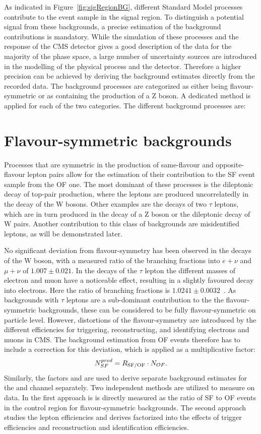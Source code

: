 As indicated in Figure~\ref{fig:sigRegionBG}, different Standard Model processes contribute to the event sample in the signal region. To distinguish a potential signal from these backgrounds, a precise estimation of the background contributions is mandatory. While the simulation of these processes and the response of the CMS detector gives a good description of the data for the majority of the phase space, a large number of uncertainty sources are introduced in the modelling of the physical process and the detector. Therefore a higher precision can be achieved by deriving the background estimates directly from the recorded data. The background processes are categorized as either being flavour-symmetric or as containing the production of a Z boson. A dedicated method is applied for each of the two categories. The different background processes are:

\section{Flavour-symmetric backgrounds}
Processes that are symmetric in the production of same-flavour and opposite-flavour lepton pairs allow for the estimation of their contribution to the SF event sample from the OF one. The most dominant of these processes is the dileptonic decay of top-pair production, where the leptons are produced uncorrelatedly in the decay of the W bosons. Other examples are the decays of two $\tau$ leptons, which are in turn produced in the decay of a Z boson or the dileptonic decay of W pairs. Another contribution to this class of backgrounds are misidentified leptons, as will be demonstrated later. 

No significant deviation from flavour-symmetry has been observed in the decays of the W boson, with a measured ratio of the branching fractions into $e+\nu$ and $\mu + \nu$ of $1.007\pm0.021$. In the decays of the $\tau$ lepton the different masses of electron and muon have a noticeable effect, resulting in a slightly favoured decay into electrons. Here the ratio of branching fractions is $1.0241\pm0.0032$~\cite{PDG}. As backgrounds with $\tau$ leptons are a sub-dominant contribution to the the flavour-symmetric backgrounds, these can be considered to be fully flavour-symmetric on particle level. However, distortions of the flavour-symmetry are introduced by the different efficiencies for triggering, reconstructing, and identifying electrons and muons in CMS. The background estimation from OF events therefore has to include a correction for this deviation, which is applied as a multiplicative factor:
\begin{equation}
N_{SF}^{pred} = R_{\text{SF/OF}} \cdot N_{OF}.
\end{equation}
Similarly, the factors \Reeof and \Rmmof are used to derive separate background estimates for the \EE and \MM channel separately. Two independent methods are utilized to measure \Rsfof on data. In the first approach is is directly measured as the ratio of SF to OF events in the control region for flavour-symmetric backgrounds. The second approach studies the lepton efficiencies and derives \Rsfof factorized into the effects of trigger efficiencies and reconstruction and identification efficiencies.  

